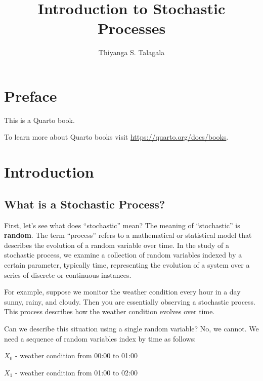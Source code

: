 \documentclass[
  letterpaper,
  DIV=11,
  numbers=noendperiod]{scrreprt}
\title{Introduction to Stochastic Processes}
\author{Thiyanga S. Talagala}
\date{}
\renewcommand*\contentsname{Table of contents}
\newcommand\contentsname{Table of contents}
\begin{document}
\maketitle

\renewcommand*\contentsname{Table of contents}
{
\hypersetup{linkcolor=}
\setcounter{tocdepth}{2}
\tableofcontents
}


\chapter*{Preface}\label{preface}


This is a Quarto book.

To learn more about Quarto books visit
\url{https://quarto.org/docs/books}.


\chapter{Introduction}\label{introduction}

\section{What is a Stochastic
Process?}\label{what-is-a-stochastic-process}

First, let's see what does ``stochastic'' mean? The meaning of
``stochastic'' is \textbf{random}. The term ``process'' refers to a
mathematical or statistical model that describes the evolution of a
random variable over time. In the study of a stochastic process, we
examine a collection of random variables indexed by a certain parameter,
typically time, representing the evolution of a system over a series of
discrete or continuous instances.

For example, suppose we monitor the weather condition every hour in a
day sunny, rainy, and cloudy. Then you are essentially observing a
stochastic process. This process describes how the weather condition
evolves over time.

Can we describe this situation using a single random variable? No, we
cannot. We need a sequence of random variables index by time as follows:

\(X_0\) - weather condition from 00:00 to 01:00

\(X_1\) - weather condition from 01:00 to 02:00
\end{document}
